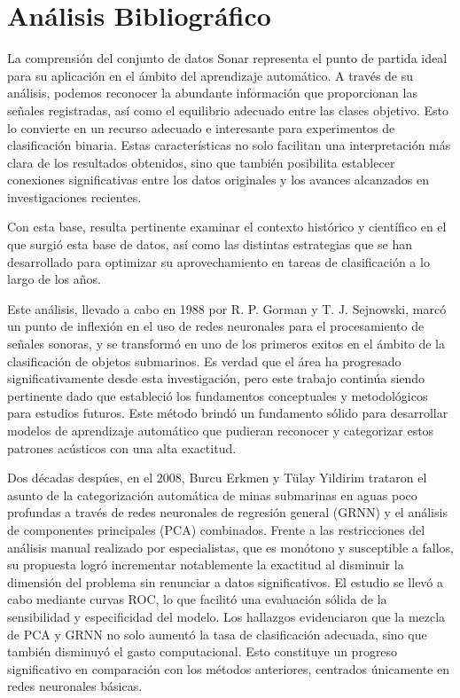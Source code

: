 \documentclass[a4paper,10pt]{article}
\begin{document}
\section{Análisis Bibliográfico}
La comprensión del conjunto de datos Sonar representa el punto de partida ideal para su aplicación en el ámbito del aprendizaje automático. A través de su análisis, podemos reconocer la abundante información que proporcionan las señales registradas, así como el equilibrio adecuado entre las clases objetivo. Esto lo convierte en un recurso adecuado e interesante para experimentos de clasificación binaria. Estas características no solo facilitan una interpretación más clara de los resultados obtenidos, sino que también posibilita establecer conexiones significativas entre los datos originales y los avances alcanzados en investigaciones recientes.

Con esta base, resulta pertinente examinar el contexto histórico y científico en el que surgió esta base de datos, así como las distintas estrategias que se han desarrollado para optimizar su aprovechamiento en tareas de clasificación a lo largo de los años.

Este análisis, llevado a cabo en 1988 por R. P. Gorman y T. J. Sejnowski, marcó un punto de inflexión en el uso de redes neuronales para el procesamiento de señales sonoras, y se transformó en uno de los primeros exitos en el ámbito de la clasificación de objetos submarinos. Es verdad que el área ha progresado significativamente desde esta investigación, pero este trabajo continúa siendo pertinente dado que estableció los fundamentos conceptuales y metodológicos para estudios futuros. Este método brindó un fundamento sólido para desarrollar modelos de aprendizaje automático que pudieran reconocer y categorizar estos patrones acústicos con una alta exactitud. \cite{gorman1988}

Dos décadas despúes, en el 2008, Burcu Erkmen y Tülay Yildirim trataron el asunto de la categorización automática de minas submarinas en aguas poco profundas a través de redes neuronales de regresión general (GRNN) y el análisis de componentes principales (PCA) combinados. Frente a las restricciones del análisis manual realizado por especialistas, que es monótono y susceptible a fallos, su propuesta logró incrementar notablemente la exactitud al disminuir la dimensión del problema sin renunciar a datos significativos. El estudio se llevó a cabo mediante curvas ROC, lo que facilitó una evaluación sólida de la sensibilidad y especificidad del modelo. Los hallazgos evidenciaron que la mezcla de PCA y GRNN no solo aumentó la tasa de clasificación adecuada, sino que también disminuyó el gasto computacional. Esto constituye un progreso significativo en comparación con los métodos anteriores, centrados únicamente en redes neuronales básicas. \cite{erkmen2008}
\end{document}
